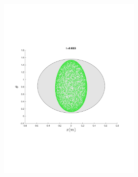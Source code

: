 \begin{figure}
{\begin{subfigure}{0.5\textwidth}
\begin{subfigure}[b]{0.5\textwidth}
        \includegraphics[trim={1cm 7cm 1cm 7cm},
        width=\textwidth]{figures/method/FunnelSimOverlaid12funnel-1y-theta}
      \end{subfigure}%
      \begin{subfigure}[b]{0.5\textwidth}

\end{subfigure}
\end{subfigure}}
\end{figure}
